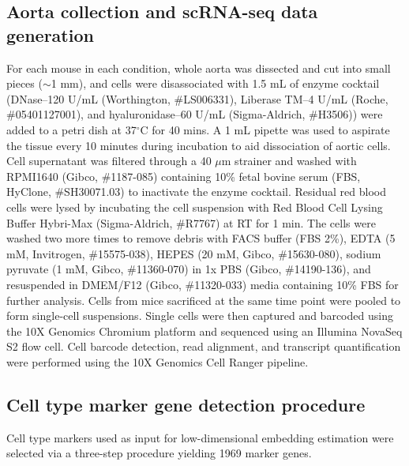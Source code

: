 \documentclass[12pt]{article}
\begin{document}
\subsection*{Aorta collection and scRNA-seq data generation}

For each mouse in each condition, whole aorta was dissected and cut into small pieces ($\sim$1 mm), and cells were disassociated with 1.5 mL of enzyme cocktail (DNase--120 U/mL (Worthington, \#LS006331), Liberase TM--4 U/mL (Roche, \#05401127001), and hyaluronidase--60 U/mL (Sigma-Aldrich, \#H3506)) were added to a petri dish at 37$^{\circ}$C for 40 mins.
A 1 mL pipette was used to aspirate the tissue every 10 minutes during incubation to aid dissociation of aortic cells. Cell supernatant was filtered through a 40 $\mu$m strainer and washed with RPMI1640 (Gibco, \#1187-085) containing 10\% fetal bovine serum (FBS, HyClone, \#SH30071.03) to inactivate the enzyme cocktail. 
Residual red blood cells were lysed by incubating the cell suspension with Red Blood Cell Lysing Buffer Hybri-Max (Sigma-Aldrich, \#R7767) at RT for 1 min. 
The cells were washed two more times to remove debris with FACS buffer (FBS 2\%), EDTA (5 mM, Invitrogen, \#15575-038), HEPES (20 mM, Gibco, \#15630-080), sodium pyruvate (1 mM, Gibco, \#11360-070) in 1x PBS (Gibco, \#14190-136), and resuspended in DMEM/F12 (Gibco, \#11320-033) media containing 10\% FBS for further analysis. 
Cells from mice sacrificed at the same time point were pooled to form single-cell suspensions. 
Single cells were then captured and barcoded using the 10X Genomics Chromium platform and sequenced using an Illumina NovaSeq S2 flow cell. 
Cell barcode detection, read alignment, and transcript quantification were performed using the 10X Genomics Cell Ranger pipeline.

\subsection*{Cell type marker gene detection procedure}

Cell type markers used as input for low-dimensional embedding estimation were selected via a
three-step procedure yielding 1969 marker genes.
\end{document}
